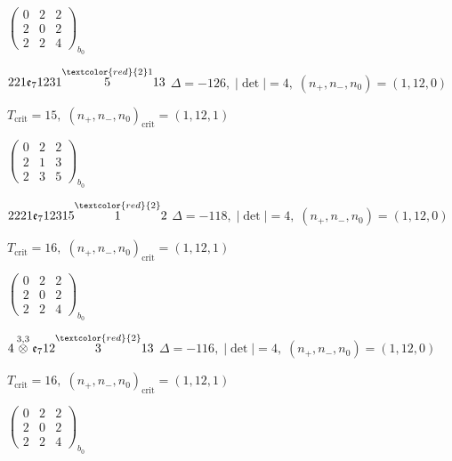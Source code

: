 \documentclass[10pt]{article}
\begin{document}
\hspace{2em}$\left(\begin{smallmatrix}0 & 2 & 2 \\ 2 & 0 & 2 \\ 2 & 2 & 4\end{smallmatrix}\right)_{\!b_0}$

\smallskip

$221\mathfrak{e}_71231\overset{\textcolor{red}{2}1}{5}13$ \quad $\Delta=-126,\; |\det|=4,\; (n_+,n_-,n_0)=(1,12,0)$

\hspace{1em}$T_{\text{crit}}=15,\; (n_+,n_-,n_0)_{\text{crit}}=(1,12,1)$

\hspace{2em}$\left(\begin{smallmatrix}0 & 2 & 2 \\ 2 & 1 & 3 \\ 2 & 3 & 5\end{smallmatrix}\right)_{\!b_0}$

\smallskip

$2221\mathfrak{e}_712315\overset{\textcolor{red}{2}}{1}2$ \quad $\Delta=-118,\; |\det|=4,\; (n_+,n_-,n_0)=(1,12,0)$

\hspace{1em}$T_{\text{crit}}=16,\; (n_+,n_-,n_0)_{\text{crit}}=(1,12,1)$

\hspace{2em}$\left(\begin{smallmatrix}0 & 2 & 2 \\ 2 & 0 & 2 \\ 2 & 2 & 4\end{smallmatrix}\right)_{\!b_0}$

\smallskip

$4\overset{3,3}{\otimes}\mathfrak{e}_712\overset{\textcolor{red}{2}}{3}13$ \quad $\Delta=-116,\; |\det|=4,\; (n_+,n_-,n_0)=(1,12,0)$

\hspace{1em}$T_{\text{crit}}=16,\; (n_+,n_-,n_0)_{\text{crit}}=(1,12,1)$

\hspace{2em}$\left(\begin{smallmatrix}0 & 2 & 2 \\ 2 & 0 & 2 \\ 2 & 2 & 4\end{smallmatrix}\right)_{\!b_0}$
\end{document}
